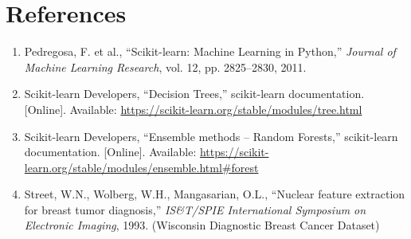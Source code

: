 \documentclass[12pt,a4paper]{article}
\begin{document}
\section{References}
\begin{enumerate}
\item Pedregosa, F. et al., ``Scikit-learn: Machine Learning in Python,'' \textit{Journal of Machine Learning Research}, vol. 12, pp. 2825--2830, 2011.
\item Scikit-learn Developers, ``Decision Trees,'' scikit-learn documentation. [Online]. Available: \url{https://scikit-learn.org/stable/modules/tree.html}
\item Scikit-learn Developers, ``Ensemble methods -- Random Forests,'' scikit-learn documentation. [Online]. Available: \url{https://scikit-learn.org/stable/modules/ensemble.html\#forest}
\item Street, W.N., Wolberg, W.H., Mangasarian, O.L., ``Nuclear feature extraction for breast tumor diagnosis,'' \textit{IS\&T/SPIE International Symposium on Electronic Imaging}, 1993. (Wisconsin Diagnostic Breast Cancer Dataset)
\end{enumerate}
\end{document}
